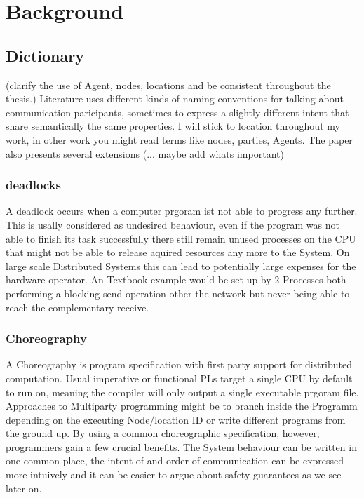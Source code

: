 \chapter{Background}
\label{ch:background}
\section{Dictionary}

(clarify the use of Agent, nodes, locations and be consistent throughout the thesis.)
Literature uses different kinds of naming conventions for talking about communication paricipants, sometimes to express a slightly different intent that share semantically the same properties. I will stick to location throughout my work, in other work you might read terms like nodes, parties, Agents. The paper also presents several extensions (... maybe add whats important)

\subsection{deadlocks}
A deadlock occurs when a computer prgoram ist not able to progress any further. This is usally considered as undesired behaviour, even if the program was not able to finish its task successfully there still remain unused processes on the CPU that might not be able to release aquired resources any more to the System. On large scale Distributed Systems this can lead to potentially large expenses for the hardware operator. An Textbook example would be set up by 2 Processes both performing a blocking send operation other the network but never being able to reach the complementary receive.
\subsection{Choreography}
A Choreography is program specification with first party support for distributed computation. Usual imperative or functional PLs target a single CPU by default to run on, meaning the compiler will only output a single executable prgoram file. Approaches to Multiparty programming might be to branch inside the Programm depending on the executing Node/location ID or write different programs from the ground up.
By using a common choreographic specification, however, programmers gain a few crucial benefits. The System behaviour can be written in one common place, the intent of and order of communication can be expressed more intuively and it can be easier to argue about safety guarantees as we see later on.

